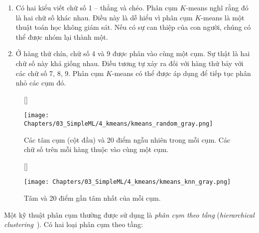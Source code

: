 \begin{enumerate}
    \item Có hai kiểu viết chữ số 1 -- thẳng và chéo. Phân cụm $K$-means
    nghĩ rằng đó là hai chữ số khác nhau. Điều này là dễ hiểu vì phân cụm $K$-means
    là một thuật toán học không giám sát. Nếu có sự can thiệp của
    con người, chúng có thể được nhóm lại thành một. 


    \item Ở hàng thứ chín, chữ số 4 và 9 được phân vào cùng một cụm. Sự
    thật là hai chữ số này khá giống nhau. Điều tương tự xảy ra đối với
    hàng thứ bảy với các chữ số 7, 8, 9. Phân cụm $K$-means có thể được áp dụng để tiếp tục phân nhỏ các cụm đó.

\end{enumerate}

\begin{figure}[t]
    [\FBwidth]
    {\caption{ 
    Các tâm cụm (cột đầu) và 20 điểm {ngẫu nhiên} trong mỗi cụm. Các chữ số trên mỗi hàng thuộc vào cùng một cụm.
    }
    \label{fig:5_random}}
    { %
    \texttt{[image: Chapters/03\_SimpleML/4\_kmeans/kmeans\_random\_gray.png]}
    }
\end{figure}

\begin{figure}[t]
    [\FBwidth]
    {\caption{ 
    Tâm và 20 điểm gần tâm nhất của mỗi cụm.
    }
    \label{fig:5_knn}}
    { %
    \texttt{[image: Chapters/03\_SimpleML/4\_kmeans/kmeans\_knn\_gray.png]}
    }
\end{figure}

Một kỹ thuật phân cụm thường được sử dụng là \textit{phân cụm theo
tầng} (\textit{hierarchical clustering}~\cite{blei2008hierarchical}). Có hai
loại phân cụm theo tầng:

